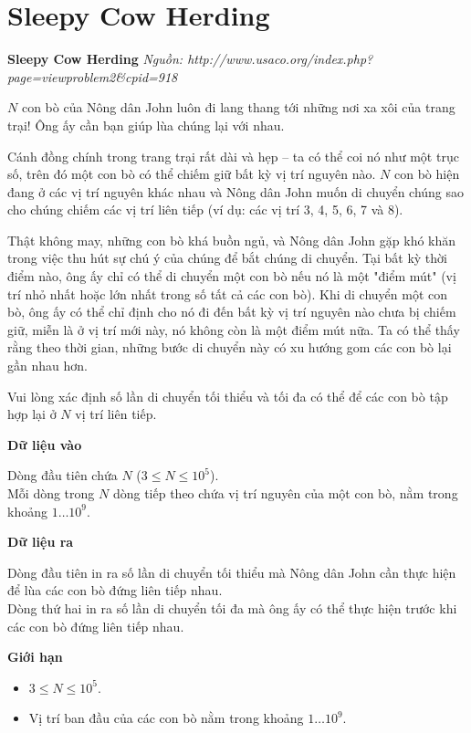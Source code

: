 \documentclass[12pt,a4paper]{article}
\newcommand{\problem}[2]{%
  \begin{mdframed}[
    linecolor=framecolor,
    linewidth=1.5pt,
    backgroundcolor=white,
    topline=true, bottomline=true,
    leftline=true, rightline=true,
    innerleftmargin=10pt, innerrightmargin=10pt,
    innertopmargin=6pt, innerbottommargin=6pt,
  ]
  \textbf{\large #1} \hfill \textit{Nguồn: #2}
  \end{mdframed}
  \vspace{4pt}%
}
\newcommand{\inputformat}{%
  \vspace{6pt}\textbf{\textcolor{sectioncolor}{Dữ liệu vào}}\par\vspace{2pt}%
}
\newcommand{\outputformat}{%
  \vspace{6pt}\textbf{\textcolor{sectioncolor}{Dữ liệu ra}}\par\vspace{2pt}%
}
\newcommand{\constraints}{%
  \vspace{6pt}\textbf{\textcolor{sectioncolor}{Giới hạn}}\par\vspace{2pt}%
}
\begin{document}
\section{Sleepy Cow Herding}
\problem{Sleepy Cow Herding}{http://www.usaco.org/index.php?page=viewproblem2\&cpid=918}

$N$ con bò của Nông dân John luôn đi lang thang tới những nơi xa xôi của trang trại! Ông ấy cần bạn giúp lùa chúng lại với nhau.

Cánh đồng chính trong trang trại rất dài và hẹp -- ta có thể coi nó như một trục số, trên đó một con bò có thể chiếm giữ bất kỳ vị trí nguyên nào. $N$ con bò hiện đang ở các vị trí nguyên khác nhau và Nông dân John muốn di chuyển chúng sao cho chúng chiếm các vị trí liên tiếp (ví dụ: các vị trí 3, 4, 5, 6, 7 và 8).

Thật không may, những con bò khá buồn ngủ, và Nông dân John gặp khó khăn trong việc thu hút sự chú ý của chúng để bắt chúng di chuyển. Tại bất kỳ thời điểm nào, ông ấy chỉ có thể di chuyển một con bò nếu nó là một "điểm mút" (vị trí nhỏ nhất hoặc lớn nhất trong số tất cả các con bò). Khi di chuyển một con bò, ông ấy có thể chỉ định cho nó đi đến bất kỳ vị trí nguyên nào chưa bị chiếm giữ, miễn là ở vị trí mới này, nó không còn là một điểm mút nữa. Ta có thể thấy rằng theo thời gian, những bước di chuyển này có xu hướng gom các con bò lại gần nhau hơn.

Vui lòng xác định số lần di chuyển tối thiểu và tối đa có thể để các con bò tập hợp lại ở $N$ vị trí liên tiếp.

\inputformat
\begin{inputbox}
Dòng đầu tiên chứa $N$ ($3 \le N \le 10^5$).\\
Mỗi dòng trong $N$ dòng tiếp theo chứa vị trí nguyên của một con bò, nằm trong khoảng $1 \dots 10^9$.
\end{inputbox}

\outputformat
\begin{outputbox}
Dòng đầu tiên in ra số lần di chuyển tối thiểu mà Nông dân John cần thực hiện để lùa các con bò đứng liên tiếp nhau.\\
Dòng thứ hai in ra số lần di chuyển tối đa mà ông ấy có thể thực hiện trước khi các con bò đứng liên tiếp nhau.
\end{outputbox}

\constraints
\begin{constraintbox}
\begin{itemize}
    \item $3 \le N \le 10^5$.
    \item Vị trí ban đầu của các con bò nằm trong khoảng $1 \dots 10^9$.
\end{itemize}
\end{constraintbox}
\end{document}
